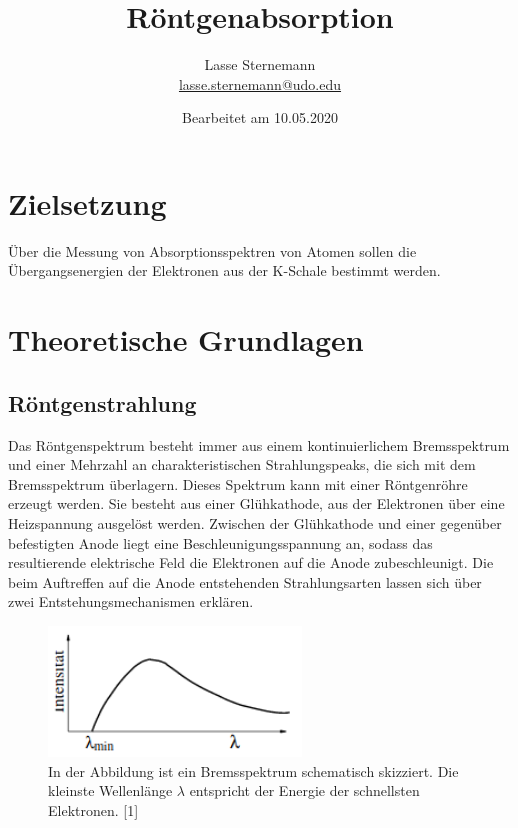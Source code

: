 \documentclass[titlepage = firstcover]{scrartcl}
\title{Röntgenabsorption}
\author{
  Lasse Sternemann\\
  \href{mailto:lasse.sternemann@udo.edu}{lasse.sternemann@udo.edu}
}
\date{Bearbeitet am 10.05.2020}
\begin{document}
    \maketitle
    \newpage
    \tableofcontents
    \newpage

    \section{Zielsetzung}
        Über die Messung von Absorptionsspektren von Atomen sollen die Übergangsenergien der Elektronen aus der K-Schale bestimmt werden.



    \section{Theoretische Grundlagen}
        \subsection{Röntgenstrahlung} \label{Röntgen}
            Das Röntgenspektrum besteht immer aus einem kontinuierlichem Bremsspektrum und einer Mehrzahl an charakteristischen Strahlungspeaks, die sich mit dem Bremsspektrum überlagern.
            Dieses Spektrum kann mit einer Röntgenröhre erzeugt werden. Sie besteht aus einer Glühkathode, aus der Elektronen über eine Heizspannung ausgelöst werden. Zwischen der Glühkathode und einer
            gegenüber befestigten Anode liegt eine Beschleunigungsspannung an, sodass das resultierende elektrische Feld die Elektronen auf die Anode zubeschleunigt. Die beim Auftreffen auf die Anode 
            entstehenden Strahlungsarten lassen sich über zwei Entstehungsmechanismen erklären.

            \FloatBarrier

            \begin{figure}[h]
              \centering
              \includegraphics[width = 0.6\textwidth]{Brems.png}
              \caption{In der Abbildung ist ein Bremsspektrum schematisch skizziert. Die kleinste Wellenlänge $\lambda$ entspricht der Energie der schnellsten Elektronen. [1]}
              \label{fig:SkizzeBrems}
            \end{figure}
\end{document}
